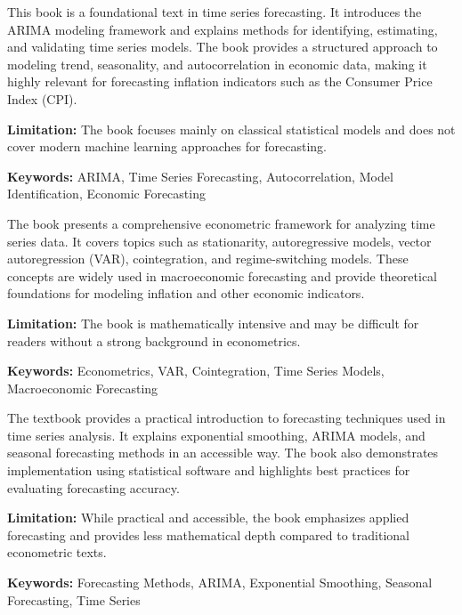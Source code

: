 %
%
%
%

{
	This book \cite{Box2015} is a foundational text in time series forecasting. It introduces the ARIMA modeling framework and explains methods for identifying, estimating, and validating time series models. The book provides a structured approach to modeling trend, seasonality, and autocorrelation in economic data, making it highly relevant for forecasting inflation indicators such as the Consumer Price Index (CPI).
	
	\bigskip
	
	\textbf{Limitation:} The book focuses mainly on classical statistical models and does not cover modern machine learning approaches for forecasting.
	
	\scriptsize{\textbf{Keywords:} ARIMA, Time Series Forecasting, Autocorrelation, Model Identification, Economic Forecasting}
}


{
	The book \cite{Hamilton1994} presents a comprehensive econometric framework for analyzing time series data. It covers topics such as stationarity, autoregressive models, vector autoregression (VAR), cointegration, and regime-switching models. These concepts are widely used in macroeconomic forecasting and provide theoretical foundations for modeling inflation and other economic indicators.
	
	\bigskip
	
	\textbf{Limitation:} The book is mathematically intensive and may be difficult for readers without a strong background in econometrics.
	
	\scriptsize{\textbf{Keywords:} Econometrics, VAR, Cointegration, Time Series Models, Macroeconomic Forecasting}
}


{
	The textbook \cite{Hyndman2021} provides a practical introduction to forecasting techniques used in time series analysis. It explains exponential smoothing, ARIMA models, and seasonal forecasting methods in an accessible way. The book also demonstrates implementation using statistical software and highlights best practices for evaluating forecasting accuracy.
	
	\bigskip
	
	\textbf{Limitation:} While practical and accessible, the book emphasizes applied forecasting and provides less mathematical depth compared to traditional econometric texts.
	
	\scriptsize{\textbf{Keywords:} Forecasting Methods, ARIMA, Exponential Smoothing, Seasonal Forecasting, Time Series}
}

